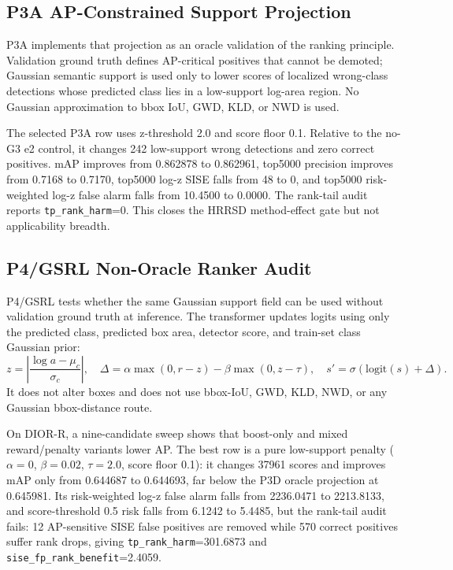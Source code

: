 \documentclass[10pt]{article}
\begin{document}
\subsection{P3A AP-Constrained Support Projection}

P3A implements that projection as an oracle validation of the ranking principle.
Validation ground truth defines AP-critical positives that cannot be demoted;
Gaussian semantic support is used only to lower scores of localized
wrong-class detections whose predicted class lies in a low-support log-area
region.  No Gaussian approximation to bbox IoU, GWD, KLD, or NWD is used.

The selected P3A row uses z-threshold 2.0 and score floor 0.1.  Relative to the
no-G3 e2 control, it changes 242 low-support wrong detections and zero correct
positives.  mAP improves from 0.862878 to 0.862961, top5000 precision improves
from 0.7168 to 0.7170, top5000 log-z SISE falls from 48 to 0, and top5000
risk-weighted log-z false alarm falls from 10.4500 to 0.0000.  The rank-tail
audit reports \texttt{tp\_rank\_harm}=0.  This closes the HRRSD method-effect
gate but not applicability breadth.

\subsection{P4/GSRL Non-Oracle Ranker Audit}

P4/GSRL tests whether the same Gaussian support field can be used without
validation ground truth at inference.  The transformer updates logits using
only the predicted class, predicted box area, detector score, and train-set
class Gaussian prior:
\[
z=\left|\frac{\log a-\mu_c}{\sigma_c}\right|,\quad
\Delta=\alpha\max(0,r-z)-\beta\max(0,z-\tau),\quad
s'=\sigma(\mathrm{logit}(s)+\Delta).
\]
It does not alter boxes and does not use bbox-IoU, GWD, KLD, NWD, or any
Gaussian bbox-distance route.

On DIOR-R, a nine-candidate sweep shows that boost-only and mixed
reward/penalty variants lower AP.  The best row is a pure low-support penalty
(\(\alpha=0\), \(\beta=0.02\), \(\tau=2.0\), score floor 0.1): it changes
37961 scores and improves mAP only from 0.644687 to 0.644693, far below the
P3D oracle projection at 0.645981.  Its risk-weighted log-z false alarm falls
from 2236.0471 to 2213.8133, and score-threshold 0.5 risk falls from 6.1242
to 5.4485, but the rank-tail audit fails: 12 AP-sensitive SISE false positives
are removed while 570 correct positives suffer rank drops, giving
\texttt{tp\_rank\_harm}=301.6873 and \texttt{sise\_fp\_rank\_benefit}=2.4059.
\end{document}
